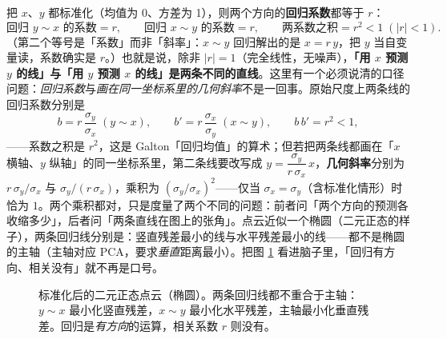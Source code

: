 把 $x$、$y$ 都标准化（均值为 0、方差为 1），则两个方向的\textbf{回归系数}都等于 $r$：
\[
  \text{回归 } y \sim x \text{ 的系数} = r,
  \qquad
  \text{回归 } x \sim y \text{ 的系数} = r,
  \qquad
  \text{两系数之积} = r^2 < 1 \; (|r| < 1).
\]
（第二个等号是「系数」而非「斜率」：$x \sim y$ 回归解出的是 $x = r\,y$，把 $y$ 当自变量读，系数确实是 $r$。）也就是说，除非 $|r| = 1$（完全线性，无噪声），\textbf{「用 $x$ 预测 $y$ 的线」与「用 $y$ 预测 $x$ 的线」是两条不同的直线}。这里有一个必须说清的口径问题：\textit{回归系数}与\textit{画在同一坐标系里的几何斜率}不是一回事。原始尺度上两条线的回归系数分别是
\[
  b = r\,\frac{\sigma_y}{\sigma_x} \;(y \sim x), \qquad
  b' = r\,\frac{\sigma_x}{\sigma_y} \;(x \sim y),
  \qquad b\, b' = r^2 < 1,
\]
——系数之积是 $r^2$，这是 Galton「回归均值」的算术；但若把两条线都画在「$x$ 横轴、$y$ 纵轴」的同一坐标系里，第二条线要改写成 $y = \dfrac{\sigma_y}{r\,\sigma_x}\,x$，\textbf{几何斜率}分别为 $r\,\sigma_y/\sigma_x$ 与 $\sigma_y/(r\,\sigma_x)$，乘积为 $(\sigma_y/\sigma_x)^2$——仅当 $\sigma_x = \sigma_y$（含标准化情形）时恰为 $1$。两个乘积都对，只是度量了两个不同的问题：前者问「两个方向的预测各收缩多少」，后者问「两条直线在图上的张角」。点云近似一个椭圆（二元正态的样子），两条回归线分别是：竖直残差最小的线与水平残差最小的线——都不是椭圆的主轴（主轴对应 PCA，要求\textit{垂直}距离最小）。把图 \ref{fig:ellipse} 看进脑子里，「回归有方向、相关没有」就不再是口号。

\begin{figure}[htbp]
\centering
{}
\caption{标准化后的二元正态点云（椭圆）。两条回归线都不重合于主轴：$y \sim x$ 最小化竖直残差，$x \sim y$ 最小化水平残差，主轴最小化垂直残差。回归是\textit{有方向}的运算，相关系数 $r$ 则没有。}
\label{fig:ellipse}
\end{figure}

